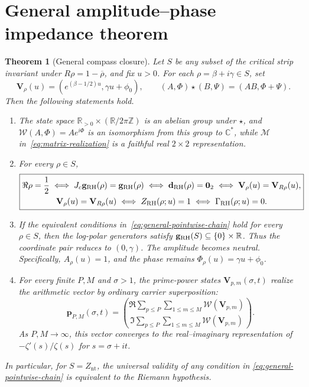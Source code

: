 \documentclass[11pt]{article}
\newtheorem{theorem}[definition]{Theorem}
\newcommand{\Znt}{Z_{\mathrm{nt}}}
\newcommand{\vzero}{\mathbf 0}
\begin{document}
\section{General amplitude--phase impedance theorem}
\begin{theorem}[General compass closure]\label{thm:general-compass}
Let $S$ be any subset of the critical strip invariant under
$R\rho=1-\overline\rho$, and fix $u>0$.  For each $\rho=\beta+i\gamma\in S$, set
\begin{equation}
 \mathbf V_\rho(u)=\left(e^{(\beta-1/2)u},\gamma u+\phi_0\right),
 \qquad
 (A,\Phi)\star(B,\Psi)=(AB,\Phi+\Psi).
\end{equation}
Then the following statements hold.

\begin{enumerate}
 \item The state space
 $\mathbb R_{>0}\times(\mathbb R/2\pi\mathbb Z)$ is an abelian group under $\star$, and
 $\mathcal W(A,\Phi)=Ae^{i\Phi}$ is an isomorphism from this group to $\mathbb C^*$, while
 $\mathcal M$ in~\eqref{eq:matrix-realization} is a faithful real $2\times2$ representation.

 \item For every $\rho\in S$,
 \begin{equation}\label{eq:general-pointwise-chain}
 \boxed{\begin{gathered}
 \Re\rho=\frac12
 \iff J_c\mathbf g_{\rm RH}(\rho)=\mathbf g_{\rm RH}(\rho)
 \iff \mathbf d_{\rm RH}(\rho)=\vzero_2
 \iff \mathbf V_\rho(u)=\mathbf V_{R\rho}(u),\\
 \mathbf V_\rho(u)=\mathbf V_{R\rho}(u)
 \iff Z_{\rm RH}(\rho;u)=1
 \iff \Gamma_{\rm RH}(\rho;u)=0.
 \end{gathered}}
 \end{equation}

 \item If the equivalent conditions in~\eqref{eq:general-pointwise-chain} hold for every
 $\rho\in S$, then the log-polar generators satisfy
 $\mathbf g_{\rm RH}(S)\subseteq\{0\}\times\mathbb R$.  Thus the coordinate pair reduces
 to $(0,\gamma)$.  The amplitude becomes neutral.  Specifically, $A_\rho(u)=1$, and the
 phase remains $\Phi_\rho(u)=\gamma u+\phi_0$.

 \item For every finite $P,M$ and $\sigma>1$, the prime-power states
 $\mathbf V_{p,m}(\sigma,t)$ realize the arithmetic vector by ordinary carrier
 superposition:
 \begin{equation}\label{eq:general-prime-realization}
  \mathbf p_{P,M}(\sigma,t)
  =\binom{\Re\displaystyle\sum_{p\le P}\sum_{1\le m\le M}
      \mathcal W(\mathbf V_{p,m})}
     {\Im\displaystyle\sum_{p\le P}\sum_{1\le m\le M}
      \mathcal W(\mathbf V_{p,m})}.
 \end{equation}
 As $P,M\to\infty$, this vector converges to the real--imaginary representation of
 $-\zeta'(s)/\zeta(s)$ for $s=\sigma+it$.
\end{enumerate}

In particular, for $S=\Znt$, the universal validity of any condition in
\eqref{eq:general-pointwise-chain} is equivalent to the Riemann hypothesis.
\end{theorem}
\end{document}
